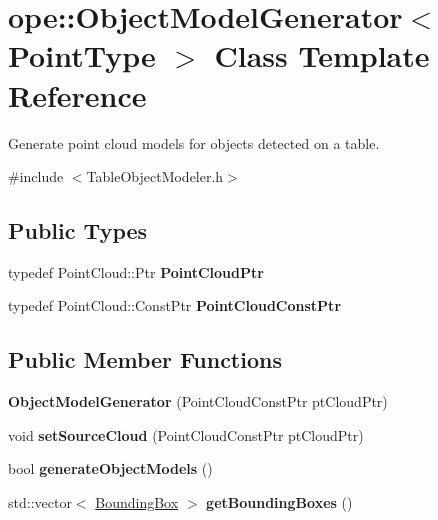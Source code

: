\hypertarget{classope_1_1_object_model_generator}{\section{ope\-:\-:Object\-Model\-Generator$<$ Point\-Type $>$ Class Template Reference}
\label{classope_1_1_object_model_generator}
}


Generate point cloud models for objects detected on a table.  




{\ttfamily \#include $<$Table\-Object\-Modeler.\-h$>$}

\subsection*{Public Types}
\begin{DoxyCompactItemize}
\item 
\hypertarget{classope_1_1_object_model_generator_ab297a5f7b5eb64f6f6223ed60e6a1147}{typedef Point\-Cloud\-::\-Ptr {\bfseries Point\-Cloud\-Ptr}}\label{classope_1_1_object_model_generator_ab297a5f7b5eb64f6f6223ed60e6a1147}

\item 
\hypertarget{classope_1_1_object_model_generator_a4ca640e5a8673e2c9190808799bef230}{typedef Point\-Cloud\-::\-Const\-Ptr {\bfseries Point\-Cloud\-Const\-Ptr}}\label{classope_1_1_object_model_generator_a4ca640e5a8673e2c9190808799bef230}

\end{DoxyCompactItemize}
\subsection*{Public Member Functions}
\begin{DoxyCompactItemize}
\item 
\hypertarget{classope_1_1_object_model_generator_a7997c862f323103eba38e0fbaf4c4b1f}{{\bfseries Object\-Model\-Generator} (Point\-Cloud\-Const\-Ptr pt\-Cloud\-Ptr)}\label{classope_1_1_object_model_generator_a7997c862f323103eba38e0fbaf4c4b1f}

\item 
\hypertarget{classope_1_1_object_model_generator_ab94cb336926cc25dea8ec4490ca52ce0}{void {\bfseries set\-Source\-Cloud} (Point\-Cloud\-Const\-Ptr pt\-Cloud\-Ptr)}\label{classope_1_1_object_model_generator_ab94cb336926cc25dea8ec4490ca52ce0}

\item 
\hypertarget{classope_1_1_object_model_generator_ae6d0cf0637bdb975ca9e097f2e1d5139}{bool {\bfseries generate\-Object\-Models} ()}\label{classope_1_1_object_model_generator_ae6d0cf0637bdb975ca9e097f2e1d5139}

\item 
\hypertarget{classope_1_1_object_model_generator_a04dc4e3a7280759f42454ae3d389b962}{std\-::vector$<$ \hyperlink{classope_1_1_bounding_box}{Bounding\-Box} $>$ {\bfseries get\-Bounding\-Boxes} ()}\label{classope_1_1_object_model_generator_a04dc4e3a7280759f42454ae3d389b962}

\end{DoxyCompactItemize}
